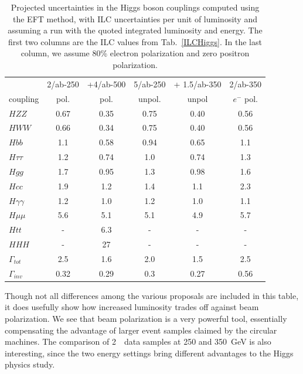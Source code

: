 \begin{table}[!htbp]
\begin{center}
\begin{tabular}{l|cc|c|c|c}
 &  2/ab-250 & +4/ab-500 &  5/ab-250 &  + 1.5/ab-350 &  2/ab-350 \\
coupling &  pol.  &   pol.  &   unpol.  &  unpol &  $e^-$  pol. 
  \\  \hline 
$HZZ$            &             0.67&   0.35    &   0.75   & 0.40     &  0.56            \\ 
$HWW$            &         0.66  &   0.34   &   0.75   &   0.40   &   0.56    \\ 
 $Hbb$            &              1.1  &  0.58   &  0.94    &    0.65  &   1.1   \\ 
$H\tau\tau$    &          1.2  &   0.74   &   1.0   &  0.74    &   1.3     \\ 
$Hgg$ &                      1.7  & 0.95       &  1.3    &  0.98    &   1.6    \\ 
$Hcc$                       &   1.9  &  1.2   &   1.4   &   1.1   &    2.3  \\ 
$H\gamma\gamma$ &  1.2 &   1.0     &  1.2    &   1.0   &    1.1    \\ 
$H\mu\mu$                &  5.6  &  5.1     &  5.1    &  4.9    &    5.7
 \\ 
$Htt$  &                       -     &      6.3     &  -    &  -    &
-     \\ 
$HHH$                         &  -    &   27     &   -   &   -   &   -
 \\ \hline 
$\Gamma_{tot}$             & 2.5  & 1.6    &   2.0    &  1.5     &
2.5    \\  
$\Gamma_{inv}$          &   0.32  & 0.29    &  0.3    &  0.27   &   0.56
\\  \hline
\end{tabular}
\end{center}
\caption{ \label{tab:oursimple}    Projected uncertainties in the Higgs
  boson couplings computed using the EFT method, with  ILC uncertainties per unit of luminosity and assuming a run with the quoted integrated luminosity
  and energy.   The first two columns are the ILC values from 
  Tab.~\ref{ILCHiggs}.   In the last column, we assume 80\% electron polarization and zero positron polarization.  }
\end{table}


Though not all differences among the various proposals are included in
this table, it does usefully show how increased luminosity trades off
against beam polarization.   We see that beam polarization is a very
powerful tool, essentially compensating the advantage of larger event
samples claimed by the circular machines.   The comparison of 2~\iab\
data samples at 250 and 350~GeV is also interesting, since the two
energy settings bring different advantages to the Higgs physics study.


